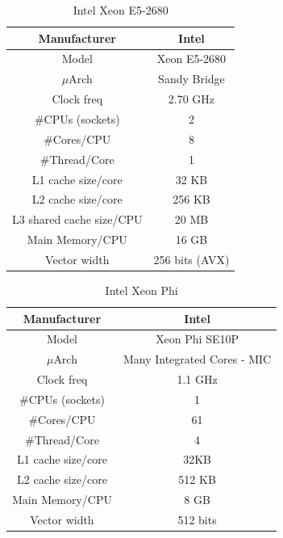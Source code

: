 \documentclass[abstract=on,9pt,twocolumn]{scrartcl}
\begin{document}
\begin{table}[H]
\centering
\footnotesize
\begin{tabular}{| c | c |}\hline
Manufacturer & Intel\\ \hline
Model & Xeon E5-2680\\ \hline
$\mu$Arch & Sandy Bridge\\ \hline
Clock freq & 2.70 GHz\\ \hline
\#CPUs (sockets) & 2 \\ \hline
\#Cores/CPU & 8\\ \hline
\#Thread/Core & 1\\ \hline
L1 cache size/core & 32 KB\\ \hline
L2 cache size/core & 256 KB\\ \hline
L3 shared cache size/CPU & 20 MB\\ \hline
Main Memory/CPU & 16 GB\\ \hline
Vector width & 256 bits (AVX)\\ \hline
\end{tabular}
\label{tab:host_stampede}
\caption{Intel Xeon E5-2680}
\end{table}

\begin{table}[H]
\centering
\footnotesize
\begin{tabular}{| c | c |}\hline
Manufacturer & Intel\\ \hline
Model & Xeon Phi SE10P\\ \hline
$\mu$Arch & Many Integrated Cores - MIC\\ \hline
Clock freq & 1.1 GHz\\ \hline
\#CPUs (sockets) & 1 \\ \hline
\#Cores/CPU & 61\\ \hline
\#Thread/Core & 4\\ \hline
L1 cache size/core & 32KB\\ \hline
L2 cache size/core & 512 KB\\ \hline
Main Memory/CPU & 8 GB\\ \hline
Vector width & 512 bits\\ \hline
\end{tabular}
\label{tab:mic}
\caption{Intel Xeon Phi}
\end{table}



\end{document}
